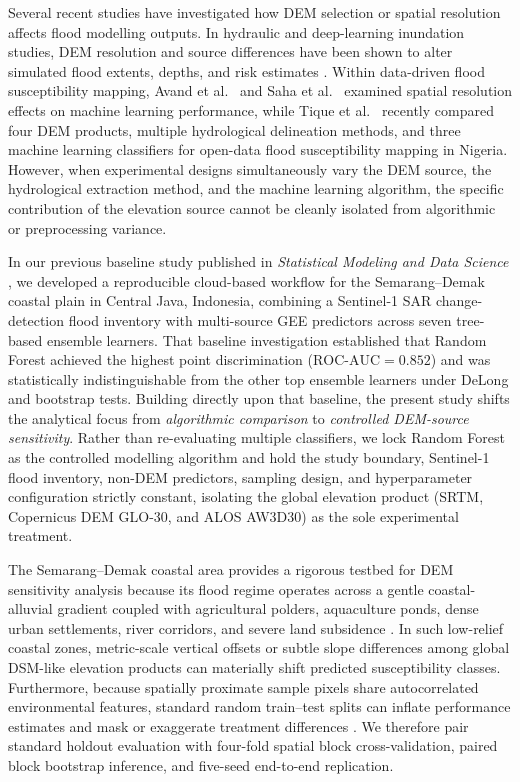 \documentclass[11pt,twoside]{article}
\begin{document}
Several recent studies have investigated how DEM selection or spatial resolution affects flood modelling outputs. In hydraulic and deep-learning inundation studies, DEM resolution and source differences have been shown to alter simulated flood extents, depths, and risk estimates \cite{ali2015,fatdillah2022,fereshtehpour2024,adesina2025,fikri2026,salgado2026}. Within data-driven flood susceptibility mapping, Avand et al.\ \cite{avand2022} and Saha et al.\ \cite{saha2021} examined spatial resolution effects on machine learning performance, while Tique et al.\ \cite{Tique2026} recently compared four DEM products, multiple hydrological delineation methods, and three machine learning classifiers for open-data flood susceptibility mapping in Nigeria. However, when experimental designs simultaneously vary the DEM source, the hydrological extraction method, and the machine learning algorithm, the specific contribution of the elevation source cannot be cleanly isolated from algorithmic or preprocessing variance.

In our previous baseline study published in \emph{Statistical Modeling and Data Science} \cite{hakim2026}, we developed a reproducible cloud-based workflow for the Semarang--Demak coastal plain in Central Java, Indonesia, combining a Sentinel-1 SAR change-detection flood inventory with multi-source GEE predictors across seven tree-based ensemble learners. That baseline investigation established that Random Forest achieved the highest point discrimination ($\text{ROC-AUC} = 0.852$) and was statistically indistinguishable from the other top ensemble learners under DeLong and bootstrap tests. Building directly upon that baseline, the present study shifts the analytical focus from \emph{algorithmic comparison} to \emph{controlled DEM-source sensitivity}. Rather than re-evaluating multiple classifiers, we lock Random Forest as the controlled modelling algorithm and hold the study boundary, Sentinel-1 flood inventory, non-DEM predictors, sampling design, and hyperparameter configuration strictly constant, isolating the global elevation product (SRTM, Copernicus DEM GLO-30, and ALOS AW3D30) as the sole experimental treatment.

The Semarang--Demak coastal area provides a rigorous testbed for DEM sensitivity analysis because its flood regime operates across a gentle coastal-alluvial gradient coupled with agricultural polders, aquaculture ponds, dense urban settlements, river corridors, and severe land subsidence \cite{marfai2008,abidin2015,Husnayaen2018,yuwono2024,verdyansyah2025,Sakina2025}. In such low-relief coastal zones, metric-scale vertical offsets or subtle slope differences among global DSM-like elevation products can materially shift predicted susceptibility classes. Furthermore, because spatially proximate sample pixels share autocorrelated environmental features, standard random train--test splits can inflate performance estimates and mask or exaggerate treatment differences \cite{roberts2017,ploton2020}. We therefore pair standard holdout evaluation with four-fold spatial block cross-validation, paired block bootstrap inference, and five-seed end-to-end replication.
\end{document}
